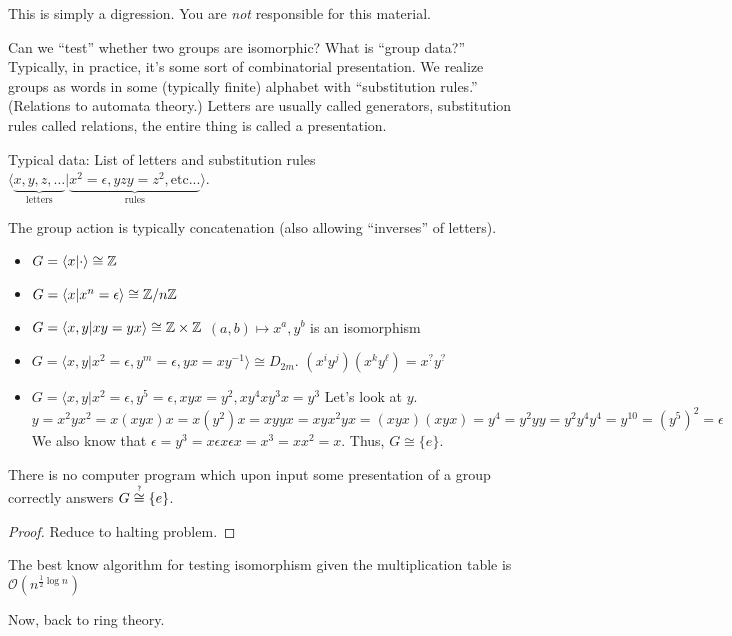 \documentclass[notes.tex]{subfiles}
\begin{document}

\begin{digression}
	This is simply a digression. You are \emph{not} responsible for this material.

	Can we ``test'' whether two groups are isomorphic?
	What is ``group data?'' Typically, in practice, it's some sort of combinatorial presentation. We realize groups as words in some (typically finite) alphabet with ``substitution rules.'' (Relations to automata theory.)
	Letters are usually called generators, substitution rules called relations, the entire thing is called a presentation.

	Typical data: List of letters and substitution rules
	$\langle \underbrace{x, y, z, \ldots}_{\text{letters}} | \underbrace{x^2 = \epsilon, yzy = z^2, \text{etc...}}_{\text{rules}} \rangle$.

	The group action is typically concatenation (also allowing ``inverses'' of letters).
	\begin{eg}\leavevmode
		\begin{itemize}
			\item $G = \langle x | \cdot \rangle \cong \mathbb{Z}$
			\item $G = \langle x | x^n = \epsilon \rangle \cong \mathbb{Z}/n\mathbb{Z}$
			\item $G = \langle x, y | xy = yx \rangle \cong \mathbb{Z} \times \mathbb{Z}$
			$(a, b)\mapsto x^a, y^b$ is an isomorphism
			\item $G = \langle x, y | x^2 = \epsilon, y^m=\epsilon, yx = xy^{-1} \rangle \cong D_{2m}$.
			$(x^iy^j)(x^ky^\ell) = x^?y^?$
			\item $G = \langle x, y | x^2=\epsilon, y^5=\epsilon, xyx=y^2, xy^4xy^3x = y^3$
			Let's look at $y$. $y=x^2yx^2= x(xyx)x=x(y^2)x=xyyx=xyx^2yx=(xyx)(xyx)=y^4=y^2yy=y^2y^4y^4 = y^{10}= (y^5)^2 = \epsilon$ We also know that $\epsilon=y^3 = x\epsilon x \epsilon x = x^3 = xx^2= x$. Thus, $G\cong\{e\}$.
		\end{itemize}
		\begin{theorem*}
			There is no computer program which upon input some presentation of a group correctly answers $G\overop{\cong}{?}\{e\}$.
		\end{theorem*}
		\begin{proof}
			Reduce to halting problem.
		\end{proof}
	\end{eg}
	The best know algorithm for testing isomorphism given the multiplication table is $\mathcal{O}(n^{\frac12\log n})$

	Now, back to ring theory.
\end{digression}
\end{document}
